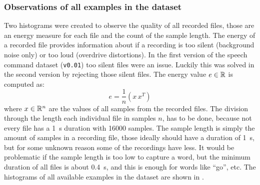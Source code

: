 \subsubsection{Observations of all examples in the dataset}
Two histograms were created to observe the quality of all recorded files, those are an energy measure for each file and the count of the sample length.
The energy of a recorded file provides information about if a recording is too silent (background noise only) or too loud (overdrive distortions). In the first version of the speech command dataset (\texttt{v0.01}) too silent files were an issue.
Luckily this was solved in the second version by rejecting those silent files.
The energy value $e \in \mathbb{R}$ is computed as:
\begin{equation}\label{eq:exp_dataset_energy}
  e = \frac{1}{n} \left( x\, x^T \right)
\end{equation}
where $x \in \mathbb{R}^n$ are the values of all samples from the recorded files.
The division through the length each individual file in samples $n$, has to be done, because not every file has a \SI{1}{\second} duration with 16000 samples.
The sample length is simply the amount of samples in a recording file, those ideally should have a duration of \SI{1}{\second}, but for some unknown reason some of the recordings have less.
It would be problematic if the sample length is too low to capture a word, but the minimum duration of all files is about \SI{0.4}{\second}, and this is enough for words like \enquote{go}, etc.
The histograms of all available examples in the dataset are shown in .

